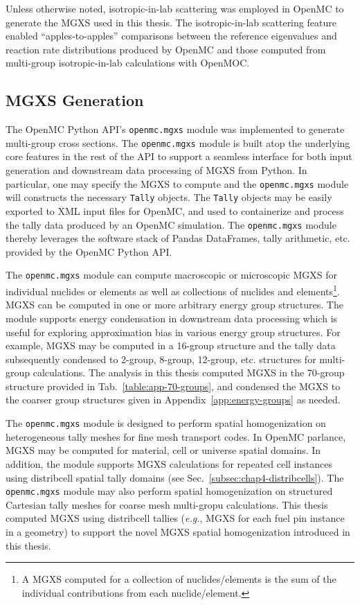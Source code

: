Unless otherwise noted, isotropic-in-lab scattering was employed in OpenMC to generate the \ac{MGXS} used in this thesis. The isotropic-in-lab scattering feature enabled ``apples-to-apples'' comparisons between the reference eigenvalues and reaction rate distributions produced by OpenMC and those computed from multi-group isotropic-in-lab calculations with OpenMOC.

\subsection{MGXS Generation}
\label{subsec:chap4-mgxs}

The OpenMC Python \ac{API}'s \texttt{openmc.mgxs} module was implemented to generate multi-group cross sections. The \texttt{openmc.mgxs} module is built atop the underlying core features in the rest of the \ac{API} to support a seamless interface for both input generation and downstream data processing of \ac{MGXS} from Python. In particular, one may specify the \ac{MGXS} to compute and the \texttt{openmc.mgxs} module will constructs the necessary \texttt{Tally} objects. The \texttt{Tally} objects may be easily exported to \ac{XML} input files for OpenMC, and used to containerize and process the tally data produced by an OpenMC simulation. The \texttt{openmc.mgxs} module thereby leverages the software stack of Pandas DataFrames, tally arithmetic, etc. provided by the OpenMC Python \ac{API}.

The \texttt{openmc.mgxs} module can compute macroscopic or microscopic \ac{MGXS} for individual nuclides or elements as well as collections of nuclides and elements\footnote{A \ac{MGXS} computed for a collection of nuclides/elements is the sum of the individual contributions from each nuclide/element.}. \ac{MGXS} can be computed in one or more arbitrary energy group structures. The module supports energy condensation in downstream data processing which is useful for exploring approximation bias in various energy group structures. For example, \ac{MGXS} may be computed in a 16-group structure and the tally data subsequently condensed to 2-group, 8-group, 12-group, etc. structures for multi-group calculations. The analysis in this thesis computed \ac{MGXS} in the 70-group structure provided in Tab.~\ref{table:app-70-groups}, and condensed the \ac{MGXS} to the coarser group structures given in Appendix~\ref{app:energy-groups} as needed.

The \texttt{openmc.mgxs} module is designed to perform spatial homogenization on heterogeneous tally meshes for fine mesh transport codes. In OpenMC parlance, \ac{MGXS} may be computed for material, cell or universe spatial domains. In addition, the module supports \ac{MGXS} calculations for repeated cell instances using distribcell spatial tally domains (see Sec.~\ref{subsec:chap4-distribcells}). The \texttt{openmc.mgxs} module may also perform spatial homogenization on structured Cartesian tally meshes for coarse mesh multi-gropu calculations. This thesis computed \ac{MGXS} using distribcell tallies (\textit{e.g.}, \ac{MGXS} for each fuel pin instance in a geometry) to support the novel \ac{MGXS} spatial homogenization introduced in this thesis.

